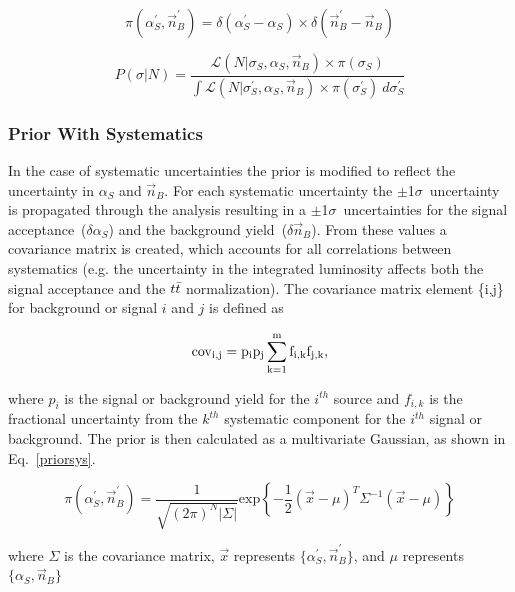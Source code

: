 \begin{equation}
\label{priornosys}
\pi(\alpha^{'}_{S}, \vec{n}^{'}_{B})=\delta(\alpha^{'}_{S}-\alpha_{S})\times\delta(\vec{n}^{'}_{B}-\vec{n}_{B})
\end{equation}

\begin{equation}
\label{postnosys}
P(\sigma|N) = \frac{\mathcal{L}(N|\sigma_{S},\alpha_{S}, \vec{n}_{B}) \times \pi(\sigma_{S})}{\int \mathcal{L}(N|\sigma^{'}_{S},\alpha_{S}, \vec{n}_{B}) \times \pi(\sigma^{'}_{S})~d\sigma^{'}_{S}}
\end{equation}

\subsubsection{Prior With Systematics}

In the case of systematic uncertainties the prior is modified to reflect the uncertainty in $\alpha_{S}$ and $\vec{n}_{B}$. For each systematic uncertainty the $\pm$1$\sigma$~uncertainty is propagated through the analysis resulting in a $\pm$1$\sigma$~uncertainties for the signal acceptance~($\delta\alpha_{S}$) and the background yield~($\delta\vec{n}_{B}$). From these values a covariance matrix is created, which accounts for all correlations between systematics (e.g. the uncertainty in the integrated luminosity affects both the signal acceptance and the $\mbox{$t\bar{t}$}$ normalization). The covariance matrix element \{i,j\} for background or signal $i$ and $j$ is defined as

\begin{equation}
\rm{cov}_{i,j} = p_{i}p_{j} \sum_{k=1}^{m} f_{i,k}f_{j,k},
\end{equation}

\noindent where $p_{i}$ is the signal or background yield for the $i^{th}$ source and $f_{i,k}$ is the fractional uncertainty from the $k^{th}$ systematic component for the $i^{th}$ signal or background. The prior is then calculated as a multivariate Gaussian, as shown in Eq.~\ref{priorsys}.

\begin{equation}
\label{priorsys}
\pi(\alpha^{'}_{S}, \vec{n}^{'}_{B})= \frac{1}{\sqrt{(2\pi)^{N}|\Sigma|}} \mathrm{exp} \left\{ -\frac{1}{2}(\vec{x} - \mu)^{T} \Sigma^{-1} (\vec{x}-\mu) \right\}
\end{equation}

\noindent where $\Sigma$ is the covariance matrix, $\vec{x}$ represents $\{ \alpha^{'}_{S}, \vec{n}^{'}_{B} \}$, and $\mu$ represents $\{ \alpha_{S}, \vec{n}_{B} \}$

